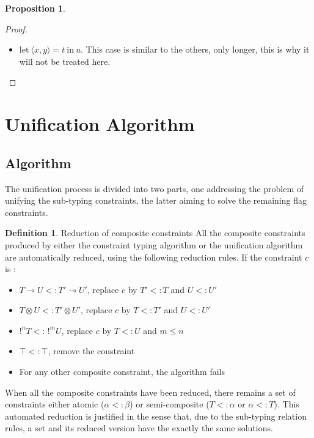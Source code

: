 \documentclass[10pt]{article}
\theoremstyle{plain}
\theoremstyle{definition}
\newtheorem{defn}{Definition}[subsection] %
\newtheorem{prop}{Proposition}[section]
\newcommand{\pair}[2]{\langle #1, #2 \rangle}
\begin{document}
\begin{prop}
\begin{proof}
\begin{itemize}
			\item $\text{let}~ \pair{x}{y} = t ~\text{in}~ u$.
				This case is similar to the others, only longer, this is why it will not be treated here.
		\end{itemize}
	\end{proof}
\end{prop}

\section{Unification Algorithm}

\subsection{Algorithm}

The unification process is divided into two parts, one addressing the problem of unifying the sub-typing constraints,
the latter aiming to solve the remaining flag constraints.

\begin{defn}{Reduction of composite constraints}
	All the composite constraints produced by either the constraint typing
  algorithm or the unification algorithm are automatically reduced, using the following reduction rules.
  If the constraint $c$ is :
  	\begin{itemize}
      \item $T \multimap U <: T' \multimap U'$, replace $c$ by $T' <: T$ and $U <: U'$
      \item $T \otimes U <: T' \otimes U'$, replace $c$ by $T <: T'$ and $U <: U'$
      \item $!^n T <: \, !^m U$, replace $c$ by $T <: U$ and $m \le n$
      \item $\top <: \top$, remove the constraint
      \item For any other composite constraint, the algorithm fails
    \end{itemize}
  When all the composite constraints have been reduced, there remains a set of constraints either atomic ($\alpha <: \beta$) or
  semi-composite ($T <: \alpha$ or $\alpha <: T$).
  This automated reduction is justified in the sense that, due to the sub-typing relation rules, a set and its reduced version
  have the exactly the same solutions.
\end{defn}
\end{document}
